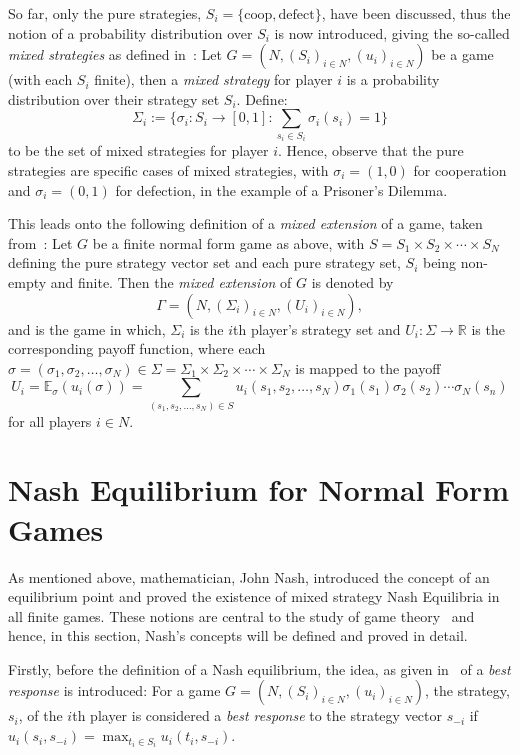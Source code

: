 So far, only the pure strategies, \(S_{i}=\{\text{coop}, \text{defect}\}\), have
been discussed, thus the notion of a probability distribution over \(S_{i}\) is
now introduced, giving the so-called \textit{mixed strategies} as defined in~\cite{maschler_solan_zamir_2013}:
Let \(G=(N, (S_{i})_{i \in N}, (u_{i})_{i \in N})\) be a game (with each \(S_{i}\)
finite), then a \textit{mixed strategy} for player \(i\) is a probability
distribution over their strategy set \(S_{i}\). Define:
\[
\Sigma_{i} := \{\sigma_{i} : S_{i} \to [0, 1] : \sum_{s_{i} \in S_{i}}{\sigma_{i}(s_{i})} = 1\}   
\]
to be the set of mixed strategies for player \(i\). Hence, observe that the pure
strategies are specific cases of mixed strategies, with \(\sigma_{i} = (1, 0)\)
for cooperation and \(\sigma_{i} = (0, 1)\) for defection, in the example of a
Prisoner's Dilemma.

This leads onto the following definition of a \emph{mixed extension} of a game,
taken from~\cite{maschler_solan_zamir_2013}:
Let \(G\) be a finite normal form game as above, with \(S = S_{1} \times
S_{2} \times \cdots \times S_{N}\) defining the pure strategy vector set and
each pure strategy set, \(S_{i}\) being non-empty and finite. Then the
\textit{mixed extension} of \(G\) is denoted by
\[
    \Gamma = (N, (\Sigma_{i})_{i \in N}, (U_{i})_{i \in N}),
\]
and is the game in which, \(\Sigma_{i}\) is the \(i\)th player's strategy set
and \(U_{i} : \Sigma \to \mathbb{R}\) is the corresponding payoff function,
where each \(\sigma = (\sigma_{1}, \sigma_{2}, \ldots, \sigma_{N}) \in \Sigma =
\Sigma_{1} \times \Sigma_{2} \times \cdots \times \Sigma_{N}\) is mapped to the
payoff
\[
    U_{i} = \mathbb{E}_{\sigma}(u_{i}(\sigma)) = \sum_{(s_{1}, s_{2}, \ldots, s_{N}) \in S}{u_{i}(s_{1}, s_{2}, \ldots, s_{N})\sigma_{1}(s_{1})\sigma_{2}(s_{2})\cdots\sigma_{N}(s_{n})}
\]
for all players \(i \in N\).

\section{Nash Equilibrium for Normal Form Games}\label{sec:NE_for_Normal_Form_Games}
As mentioned above, mathematician, John Nash, introduced the concept of an
equilibrium point and proved the existence of mixed strategy Nash Equilibria in
all finite games. These notions are central to the study of game
theory~\cite{maschler_solan_zamir_2013} and hence, in this section, Nash's
concepts will be defined and proved in detail.

Firstly, before the definition of a Nash equilibrium, the idea, as given in~\cite{maschler_solan_zamir_2013} of a \textit{best response} is introduced:
For a game \(G=(N, (S_{i})_{i \in N}, (u_{i})_{i \in N})\), the strategy,
\(s_{i}\), of the \(i\)th player is considered a \textit{best response} to the
strategy vector \(s_{-i}\) if \(u_{i}(s_{i}, s_{-i}) = \max_{t_{i} \in
S_{i}}u_{i}(t_{i}, s_{-i})\).

